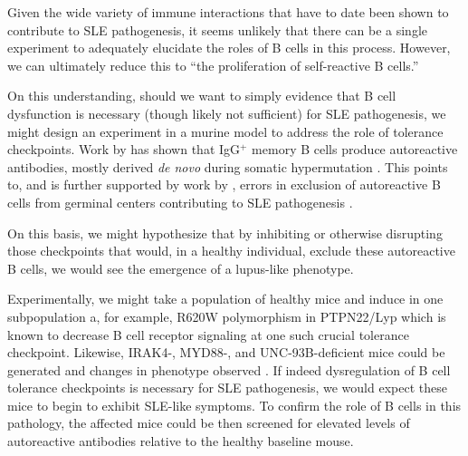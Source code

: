 \documentclass[11pt,letterpaper,final] {article}
\newenvironment{exercise}[2][Exercise]{\begin{trivlist}
	\item[\hskip \labelsep {\bfseries #1}\hskip \labelsep {\bfseries #2.}]}{\end{trivlist}}
\begin{document}
\begin{exercise}[Exercise]{4}
Given the wide variety of immune interactions that have to date been shown to contribute to SLE pathogenesis, it seems unlikely that there can be a single experiment to adequately elucidate the roles of B cells in this process. However, we can ultimately reduce this to ``the proliferation of self-reactive B cells.''

On this understanding, should we want to simply evidence that B cell dysfunction is necessary (though likely not sufficient) for SLE pathogenesis, we might design an experiment in a murine model to address the role of tolerance checkpoints. Work by \citeauthor{Tiller:2007} has shown that IgG$^{+}$ memory B cells produce autoreactive antibodies, mostly derived \textit{de novo} during somatic hypermutation \citeyear{Tiller:2007}. This points to, and is further supported by work by \citeauthor{Cappione:2005}, errors in exclusion of autoreactive B cells from germinal centers contributing to SLE pathogenesis \citeyear{Cappione:2005}.

On this basis, we might hypothesize that by inhibiting or otherwise disrupting those checkpoints that would, in a healthy individual, exclude these autoreactive B cells, we would see the emergence of a lupus-like phenotype.

Experimentally, we might take a population of healthy mice and induce in one subpopulation a, for example, R620W polymorphism in PTPN22/Lyp which is known to decrease B cell receptor signaling at one such crucial tolerance checkpoint. Likewise,  IRAK4-, MYD88-, and UNC-93B-deficient mice could be generated and changes in phenotype observed \cite{Meffre:2011}. If indeed dysregulation of B cell tolerance checkpoints is necessary for SLE pathogenesis, we would expect these mice to begin to exhibit SLE-like symptoms. To confirm the role of B cells in this pathology, the affected mice could be then screened for elevated levels of autoreactive antibodies relative to the healthy baseline mouse.

\end{exercise}
\end{document}
